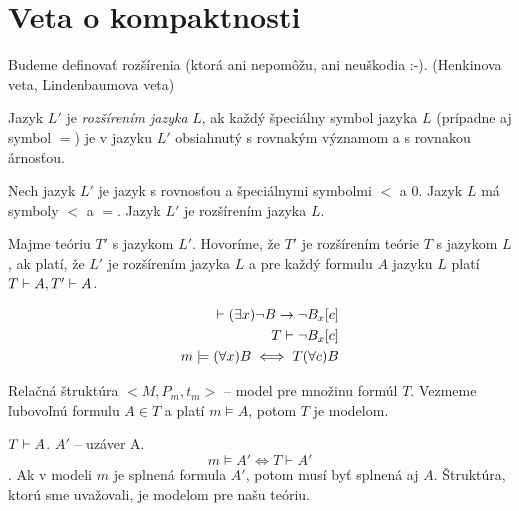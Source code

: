 \section{Veta o kompaktnosti}

Budeme definovať rozšírenia (ktorá ani nepomôžu, ani neuškodia :-). (Henkinova
veta, Lindenbaumova veta)

\begin{definicia}
    Jazyk $L'$ je \emph{rozšírením jazyka} $L$, ak každý
    špeciálny symbol jazyka $L$ (prípadne aj symbol $=$)
    je v jazyku $L'$ obsiahnutý s rovnakým významom a s rovnakou árnosťou.
\end{definicia}

\begin{priklad}
    Nech jazyk $L'$ je jazyk s rovnosťou a špeciálnymi symbolmi $<$ a $0$.
    Jazyk $L$ má symboly $<$ a $=$. Jazyk $L'$ je rozšírením jazyka $L$.
\end{priklad}    

\begin{definicia}
    Majme teóriu $T'$ s jazykom $L'$. Hovoríme, že $T'$ je
    rozšírením teórie $T$ s jazykom $L$, ak platí,
    že $L'$ je rozšírením jazyka $L$ a pre každý formulu $A$ jazyku $L$
    platí $T \vdash A, T' \vdash A$. 
\end{definicia}


\begin{veta}[Henkinova]

    \begin{align*}
        \vdash (\exists x) \neg B \rightarrow \neg B_x[c] \\
        T \vdash  \neg B_x[c] \\
        m \models  (\forall x) B \iff T (\forall c) B \\
    \end{align*}
\end{veta}


\par Relačná štruktúra $<M, P_m, t_m>$ -- model pre množinu formúl $T$. Vezmeme
ľubovoľnú formulu $A \in T$ a platí $m \models A$, potom $T$ je modelom.

\par $T \vdash A$. $A'$ -- uzáver A. $$ m \models A' \iff T \vdash A'$$. Ak v
modeli $m$ je splnená formula $A'$, potom musí byť splnená aj $A$. Štruktúra,
ktorú sme uvažovali, je modelom pre našu teóriu.

